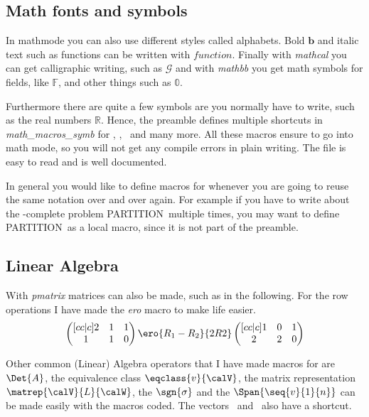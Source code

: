 \documentclass[english]{article}
\newcommand{\PARTITION}{\textsc{PARTITION}}
\begin{document}
\subsection{Math fonts and symbols}
In mathmode you can also use different styles called alphabets. Bold
$\mathbf{b}$ and italic text such as functions can be written with
$\mathit{function}$. Finally with \emph{mathcal} you can get calligraphic
writing, such as $\mathcal{G}$ and with \emph{mathbb} you get math symbols for
fields, like $\mathbb{F}$, and other things such as $\mathbb{0}$.

Furthermore there are quite a few symbols are you normally have to write, such
as the real numbers $\mathbb{R}$. Hence, the preamble defines multiple shortcuts
in \emph{math\_macros\_symb} for \C, \Q, \F\ and many more. All these macros
ensure to go into math mode, so you will not get any compile errors in plain
writing. The file is easy to read and is well documented.

In general you would like to define macros for whenever you are going to reuse
the same notation over and over again. For example if you have to write about
the \cNP-complete problem \PARTITION\ multiple times, you may want to define
\PARTITION\ as a local macro, since it is not part of the preamble.

\subsection{Linear Algebra}
With \emph{pmatrix} matrices can also be made, such as in the following. For the
row operations I have made the \emph{ero} macro to make life easier.
\begin{equation*}
  \begin{pmatrix}[cc|c]
    2 & 1 & 1
    \\
    1 & 1 & 0
  \end{pmatrix}
  \ero{R_1 - R_2}{2R2}
  \begin{pmatrix}[cc|c]
    1 & 0 & 1
    \\
    2 & 2 & 0
  \end{pmatrix}
\end{equation*}

Other common (Linear) Algebra operators that I have made macros for are
$\Det{A}$, the equivalence class $\eqclass{v}{\calV}$, the matrix representation
$\matrep{\calV}{L}{\calW}$, the $\sgn{\sigma}$ and the $\Span{\seq{v}{1}{n}}$
can be made easily with the macros coded. The vectors \allones\ and \allzeros\
also have a shortcut.
\end{document}
